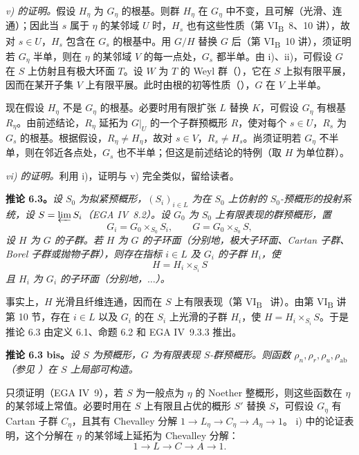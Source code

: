 \emph{v) 的证明。}假设 \(H_{\eta}\) 为 \(G_{\eta}\) 的根基。则群 \(H_{\eta}\) 在 \(G_{\eta}\) 中不变，且可解（光滑、连通）；因此当 \(s\) 属于 \(\eta\) 的某邻域 \(U\) 时，\(H_s\) 也有这些性质（第 VI\textsubscript{B}~8、10 讲），故对 \(s\in U\)，\(H_s\) 包含在 \(G_s\) 的根基中。用 \(G/H\) 替换 \(G\) 后（第 VI\textsubscript{B}~10 讲），须证明若 \(G_{\eta}\) 半单，则在 \(\eta\) 的某邻域 \(V\) 的每一点处，\(G_s\) 都半单。由 i)、ii)，可假设 \(G\) 在 \(S\) 上仿射且有极大环面 \(T\)。设 \(W\) 为 \(T\) 的 Weyl 群（），它在 \(S\) 上拟有限平展，因而在某开子集 \(V\) 上有限平展。此时由根的初等性质（），\(G\) 在 \(V\) 上半单。

现在假设 \(H_{\eta}\) 不是 \(G_{\eta}\) 的根基。必要时用有限扩张 \(L\) 替换 \(K\)，可假设 \(G_{\eta}\) 有根基 \(R_{\eta}\)。由前述结论，\(R_{\eta}\) 延拓为 \(G|_U\) 的一个子群预概形 \(R\)，使对每个 \(s\in U\)，\(R_s\) 为 \(G_s\) 的根基。根据假设，\(R_{\eta}\neq H_{\eta}\)，故对 \(s\in V\)，\(R_s\neq H_s\)。尚须证明若 \(G_{\eta}\) 不半单，则在邻近各点处，\(G_s\) 也不半单；但这是前述结论的特例（取 \(H\) 为单位群）。

\emph{vi) 的证明。}利用 i)，证明与 v) 完全类似，留给读者。

\textbf{推论 6.3。}\emph{设 \(S_0\) 为拟紧预概形，\((S_i)_{i\in L}\) 为在 \(S_0\) 上仿射的 \(S_0\)-预概形的投射系统，设 \(S=\varprojlim S_i\)（EGA IV~8.2）。设 \(G_0\) 为 \(S_0\) 上有限表现的群预概形，置
\[
  G_i=G_0\times_{S_0}S_i,\qquad G=G_0\times_{S_0}S,
\]
设 \(H\) 为 \(G\) 的子群。若 \(H\) 为 \(G\) 的子环面（分别地，极大子环面、Cartan 子群、Borel 子群或抛物子群），则存在指标 \(i\in L\) 及 \(G_i\) 的子群 \(H_i\)，使
\[
  H=H_i\times_{S_i}S
\]
且 \(H_i\) 为 \(G_i\) 的子环面（分别地，\(\ldots\)）。}

事实上，\(H\) 光滑且纤维连通，因而在 \(S\) 上有限表现（第 VI\textsubscript{B}~ 讲）。由第 VI\textsubscript{B} 讲第 10 节，存在 \(i\in L\) 以及 \(G_i\) 的在 \(S_i\) 上光滑的子群 \(H_i\)，使 \(H=H_i\times_{S_i}S\)。于是推论 6.3 由定义 6.1、命题 6.2 和 EGA IV~9.3.3 推出。

\textbf{推论 6.3 bis。}\emph{设 \(S\) 为预概形，\(G\) 为有限表现 \(S\)-群预概形。则函数 \(\rho_n,\rho_r,\rho_u,\rho_{\mathrm{ab}}\)（参见 ）在 \(S\) 上局部可构造。}

只须证明（EGA IV~9），若 \(S\) 为一般点为 \(\eta\) 的 Noether 整概形，则这些函数在 \(\eta\) 的某邻域上常值。必要时用在 \(S\) 上有限且占优的概形 \(S'\) 替换 \(S\)，可假设 \(G_{\eta}\) 有 Cartan 子群 \(C_{\eta}\)，且其有 Chevalley 分解 \(1\to L_{\eta}\to C_{\eta}\to A_{\eta}\to1\)。 i) 中的论证表明，这个分解在 \(\eta\) 的某邻域上延拓为 Chevalley 分解：
\[ 1 \longrightarrow L \longrightarrow C \longrightarrow A \longrightarrow 1. \]

